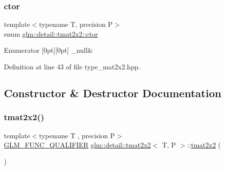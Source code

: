 \subsubsection{\texorpdfstring{ctor}{ctor}}
{\footnotesize\ttfamily template$<$typename T, precision P$>$ \\
enum \hyperlink{structglm_1_1detail_1_1tmat2x2_ac7c2fd8babbf9207cf08ffb92497a6c8}{glm\+::detail\+::tmat2x2\+::ctor}}

\begin{DoxyEnumFields}{Enumerator}
[0pt][0pt]{}\mbox{\label{structglm_1_1detail_1_1tmat2x2_ac7c2fd8babbf9207cf08ffb92497a6c8a3683117ef677621da178e009d7b8e2cf}} 
\+\_\+null&\\
\hline

\end{DoxyEnumFields}


Definition at line 43 of file type\+\_\+mat2x2.\+hpp.



\subsection{Constructor \& Destructor Documentation}
\mbox{\label{structglm_1_1detail_1_1tmat2x2_a7510f65ba2b8a0a3f8197ec3a7f7c435}} 
\subsubsection{\texorpdfstring{tmat2x2()}{tmat2x2()}\hspace{0.1cm}{\footnotesize\ttfamily [1/22]}}
{\footnotesize\ttfamily template$<$typename T , precision P$>$ \\
\hyperlink{setup_8hpp_a33fdea6f91c5f834105f7415e2a64407}{G\+L\+M\+\_\+\+F\+U\+N\+C\+\_\+\+Q\+U\+A\+L\+I\+F\+I\+ER} \hyperlink{structglm_1_1detail_1_1tmat2x2}{glm\+::detail\+::tmat2x2}$<$ T, P $>$\+::\hyperlink{structglm_1_1detail_1_1tmat2x2}{tmat2x2} (\begin{DoxyParamCaption}{ }\end{DoxyParamCaption})}



